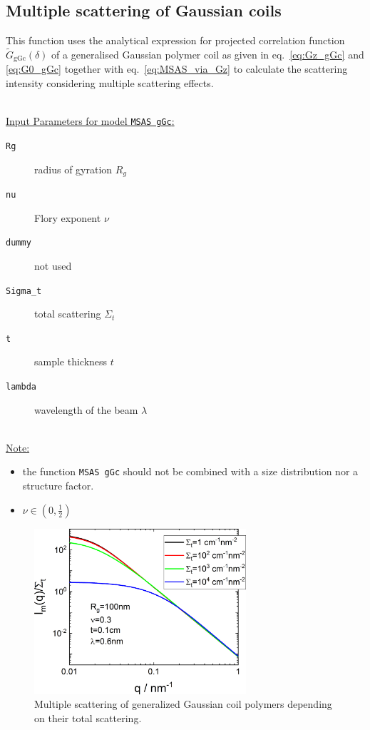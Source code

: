 \newpage
\subsection{Multiple scattering of Gaussian coils}

This function uses the analytical expression for projected correlation function $\tilde{G}_\mathrm{gGc}(\delta)$ of a generalised Gaussian polymer coil as given in eq.\ \ref{eq:Gz_gGc} and \ref{eq:G0_gGc} together with eq.\ \ref{eq:MSAS_via_Gz} to calculate the scattering intensity considering multiple scattering effects.

\hspace{1pt}\\
\uline{Input Parameters for model \texttt{MSAS gGc}:}\\
\begin{description}
\item[\texttt{Rg}] radius of gyration $R_g$
\item[\texttt{nu}] Flory exponent $\nu$
\item[\texttt{dummy}] not used
\item[\texttt{Sigma\_t}] total scattering $\Sigma_t$
\item[\texttt{t}] sample thickness $t$
\item[\texttt{lambda}] wavelength of the beam $\lambda$
\end{description}

\hspace{1pt}\\
\uline{Note:}
\begin{itemize}
\item the function \texttt{MSAS gGc} should not be combined with a size distribution nor a structure factor.
\item $\nu \in \left(0,\frac12\right)$
\end{itemize}

\begin{figure}[htb]
\begin{center}
\includegraphics[width=0.7\textwidth]{../images/form_factor/MSAS/MSAS_gGc.png}
\end{center}
\caption{Multiple scattering of generalized Gaussian coil polymers depending on their total scattering.}
\label{fig:MSAS_gGc}
\end{figure}

